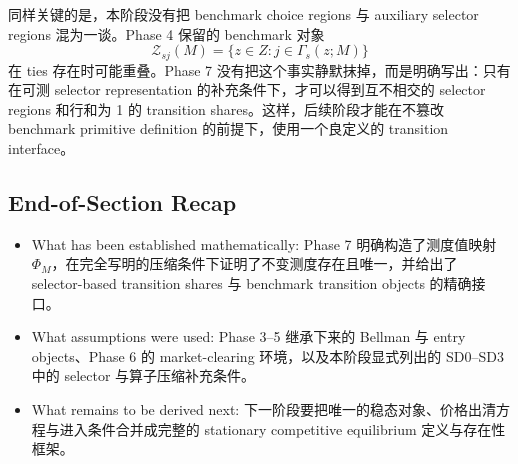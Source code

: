 同样关键的是，本阶段没有把 benchmark choice regions 与 auxiliary selector regions 混为一谈。Phase 4 保留的 benchmark 对象
\[
\mathcal Z_{sj}(M)=\{z\in Z:j\in\Gamma_s(z;M)\}
\]
在 ties 存在时可能重叠。Phase 7 没有把这个事实静默抹掉，而是明确写出：只有在可测 selector representation 的补充条件下，才可以得到互不相交的 selector regions 和行和为 1 的 transition shares。这样，后续阶段才能在不篡改 benchmark primitive definition 的前提下，使用一个良定义的 transition interface。

\subsection*{End-of-Section Recap}

\begin{itemize}
    \item What has been established mathematically: Phase 7 明确构造了测度值映射 $\Phi_M$，在完全写明的压缩条件下证明了不变测度存在且唯一，并给出了 selector-based transition shares 与 benchmark transition objects 的精确接口。
    \item What assumptions were used: Phase 3--5 继承下来的 Bellman 与 entry objects、Phase 6 的 market-clearing 环境，以及本阶段显式列出的 SD0--SD3 中的 selector 与算子压缩补充条件。
    \item What remains to be derived next: 下一阶段要把唯一的稳态对象、价格出清方程与进入条件合并成完整的 stationary competitive equilibrium 定义与存在性框架。
\end{itemize}
